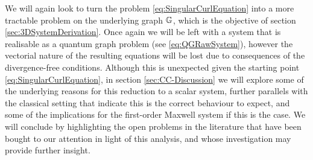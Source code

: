 We will again look to turn the problem \eqref{eq:SingularCurlEquation} into a more tractable problem on the underlying graph $\mathbb{G}$, which is the objective of section \ref{sec:3DSystemDerivation}.
Once again we will be left with a system that is realisable as a quantum graph problem (see \eqref{eq:QGRawSystem}), however the vectorial nature of the resulting equations will be lost due to consequences of the divergence-free conditions.
Although this is unexpected given the starting point \eqref{eq:SingularCurlEquation}, in section \ref{sec:CC-Discussion} we will explore some of the underlying reasons for this reduction to a scalar system, further parallels with the classical setting that indicate this is the correct behaviour to expect, and some of the implications for the first-order Maxwell system if this is the case.
We will conclude by highlighting the open problems in the literature that have been bought to our attention in light of this analysis, and whose investigation may provide further insight.